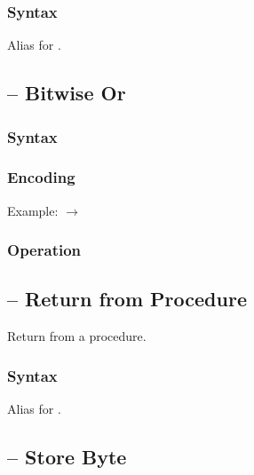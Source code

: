 \documentclass[a4paper,12pt,twoside,extrafontsizes]{memoir}
\begin{document}
{\subsubsection{Syntax}


Alias for .

\subsection{ -- Bitwise Or}
\label{subsec:instr:or}

\subsubsection{Syntax}


\subsubsection{Encoding}


Example:  $\rightarrow$ 

\subsubsection{Operation}


\subsection{ -- Return from Procedure}
\label{subsec:instr:ret}

Return from a procedure.

\subsubsection{Syntax}


Alias for .

\subsection{ -- Store Byte}
\label{subsec:instr:sb}

}
\end{document}
